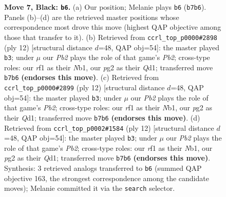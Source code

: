 \documentclass[11pt]{article}
\begin{document}
\begin{figure}[p]
\caption{\textbf{Move 7, Black: \texttt{b6}.} (a) Our position; Melanie plays \texttt{b6} (\texttt{b7b6}). Panels (b)--(d) are the retrieved master positions whose correspondence most drove this move (highest QAP objective among those that transfer to it). (b) Retrieved from \texttt{ccrl\_top\_p0000\#2898} (ply 12) [structural distance $d$=48, QAP obj=54]: the master played \texttt{b3}; under $\mu$ our \emph{Pb2} plays the role of that game's \emph{Pb2}; cross-type roles: our \emph{r}f1 as their \emph{N}b1, our \emph{p}g2 as their \emph{Q}d1; transferred move \texttt{b7b6} \textbf{(endorses this move)}. (c) Retrieved from \texttt{ccrl\_top\_p0000\#2899} (ply 12) [structural distance $d$=48, QAP obj=54]: the master played \texttt{b3}; under $\mu$ our \emph{Pb2} plays the role of that game's \emph{Pb2}; cross-type roles: our \emph{r}f1 as their \emph{N}b1, our \emph{p}g2 as their \emph{Q}d1; transferred move \texttt{b7b6} \textbf{(endorses this move)}. (d) Retrieved from \texttt{ccrl\_top\_p0002\#1584} (ply 12) [structural distance $d$=48, QAP obj=54]: the master played \texttt{b3}; under $\mu$ our \emph{Pb2} plays the role of that game's \emph{Pb2}; cross-type roles: our \emph{r}f1 as their \emph{N}b1, our \emph{p}g2 as their \emph{Q}d1; transferred move \texttt{b7b6} \textbf{(endorses this move)}. Synthesis: 3 retrieved analogs transferred to \texttt{b6} (summed QAP objective 163, the strongest correspondence among the candidate moves); Melanie committed it via the \texttt{search} selector.}
\label{fig:thought-m13}
\end{figure}

\clearpage
\end{document}
